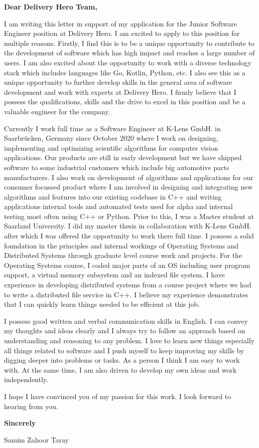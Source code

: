 \documentclass[letterpaper,11pt]{article}
\begin{document}
\textbf{Dear Delivery Hero Team,}
\vspace{1cm}


I am writing this letter in support of my application for the Junior Software Engineer
position at Delivery Hero. I am excited to apply to this position for multiple reasons. Firstly, I
find this is to be a unique opportunity to contribute to the development of software
which has high impact and reaches a large number of users. I am also excited 
about the opportunity to work with a diverse technology stack which includes
languages like Go, Kotlin, Python, etc. I also see this as a unique opportunity
to further develop skills in the general area of software development and work 
with experts at Delivery Hero. I firmly believe that I possess the 
qualifications, skills and the drive to excel in this position and be a valuable
engineer for the company.

Currently I work full time as
a Software Engineer at K-Lens GmbH. in Saarbr\"ucken, Germany since October 2020
where I work on designing, implementing and optimizing scientific algorithms for computer
vision applications. Our products are still in early development but we have shipped
software to some industrial customers which include big automotive parts manufacturers.
I also work on development of algorithms and applications for our consumer focussed
product where I am involved in designing and integrating new algorithms and features
into our existing codebase in C++ and writing applications internal tools and
automated tests used for alpha and internal testing most often using C++
or Python. Prior to this, I was a Master student at Saarland University. I did my master thesis in
collaboration with K-Lens GmbH. after which I was offered the opportunity to
work there full time. I possess a solid foundation in the principles and
internal workings of Operating Systems and Distributed Systems through graduate
level course work and projects. For the Operating Systems
course, I coded major parts of an OS including user program support, a virtual
memory subsystem and an indexed file system. I have experience in developing
distributed systems from a course project where we had to write a distributed
file service in C++. I believe my experience demonstrates that I can quickly
learn things needed to be efficient at this job.

I possess good written and verbal communication skills in English. I can convey
my thoughts and ideas clearly and I always try to follow an approach based on
understanding and reasoning to any problem. I love to learn new things
especially all things related to software and I push myself to keep improving
my skills by digging deeper into problems or tasks. As a person I think I am 
easy to work with. At the same time, I am also driven to develop my own ideas 
and work independently.

I hope I have convinced you of my passion for this work. I look forward to
hearing from you.

\vspace{1cm}
\textbf{Sincerely}

Samim Zahoor Taray
\end{document}

